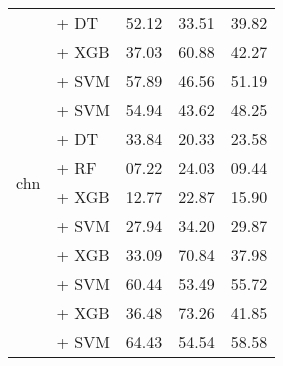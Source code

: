 \begin{longtable}{llccc}
    \midrule
    \multirow{12}{*}{chn}              & \citep{li2024conanembeddinggeneraltextembedding} + DT              & 52.12                                & 33.51              & 39.82             \\
                                       & \citep{li2024conanembeddinggeneraltextembedding} + XGB             & 37.03                                & 60.88              & 42.27             \\
                                       & \citep{li2024conanembeddinggeneraltextembedding} + SVM             & 57.89                                & 46.56              & 51.19             \\
                                       & \citep{wang2024multilingual} + SVM                                 & 54.94                                & 43.62              & 48.25             \\
                                       & \citep{zhang2024gme} + DT                                          & 33.84                                & 20.33              & 23.58             \\
                                       & \citep{zhang2024gme} + RF                                          & 07.22                                & 24.03              & 09.44             \\
                                       & \citep{zhang2024gme} + XGB                                         & 12.77                                & 22.87              & 15.90             \\
                                       & \citep{zhang2024gme} + SVM                                         & 27.94                                & 34.20              & 29.87             \\
                                       & \citep{lier0072023xiaobuembeddingv2} + XGB                         & 33.09                                & 70.84              & 37.98             \\
                                       & \citep{lier0072023xiaobuembeddingv2} + SVM                         & 60.44                                & 53.49              & 55.72             \\
                                       & \citep{zpoint-large-embedding-zh} + XGB                            & 36.48                                & 73.26              & 41.85             \\
                                       & \citep{zpoint-large-embedding-zh} + SVM                            & 64.43                                & 54.54              & 58.58             \\

\end{longtable}
